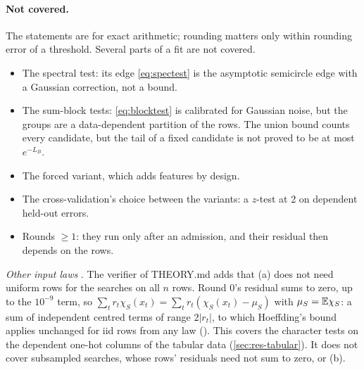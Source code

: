 \paragraph{Not covered.} The statements are for exact arithmetic; rounding matters only within rounding error of a threshold. Several parts of a fit are not covered.
\begin{itemize}
\item The spectral test: its edge \eqref{eq:spectest} is the asymptotic semicircle edge with a Gaussian correction, not a bound.
\item The sum-block tests: \cref{eq:blocktest} is calibrated for Gaussian noise, but the groups are a data-dependent partition of the rows. The union bound counts every candidate, but the tail of a fixed candidate is not proved to be at most $e^{-L_B}$.
\item The forced variant, which adds features by design.
\item The cross-validation's choice between the variants: a $z$-test at 2 on dependent held-out errors.
\item Rounds $\ge1$: they run only after an admission, and their residual then depends on the rows.
\end{itemize}
\emph{Other input laws} . The verifier of THEORY.md adds that (a) does not need uniform rows for the searches on all $n$ rows. Round 0's residual sums to zero, up to the $10^{-9}$ term, so $\sum_tr_t\chi_S(x_t)=\sum_tr_t(\chi_S(x_t)-\mu_S)$ with $\mu_S=\mathbb{E}\chi_S$: a sum of independent centred terms of range $2|r_t|$, to which Hoeffding's bound applies unchanged for iid rows from any law (). This covers the character tests on the dependent one-hot columns of the tabular data (\cref{sec:res-tabular}). It does not cover subsampled searches, whose rows' residuals need not sum to zero, or (b).

